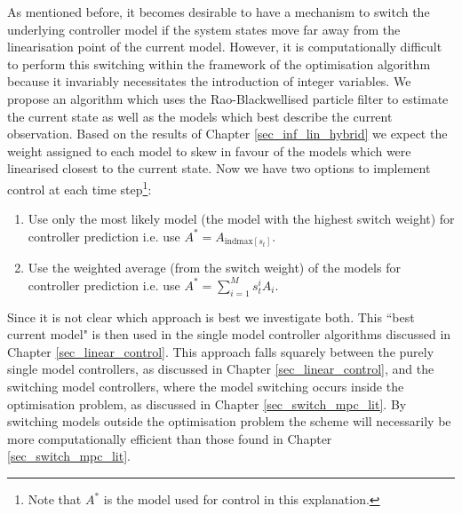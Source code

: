 As mentioned before, it becomes desirable to have a mechanism to switch the underlying controller model if the system states move far away from the linearisation point of the current model. However, it is computationally difficult to perform this switching within the framework of the optimisation algorithm because it invariably necessitates the introduction of integer variables. We propose an algorithm which uses the Rao-Blackwellised particle filter to estimate the current state as well as the models which best describe the current observation. Based on the results of Chapter \ref{sec_inf_lin_hybrid} we expect the weight assigned to each model to skew in favour of the models which were linearised closest to the current state. Now we have two options to implement control at each time step\footnote{Note that $A^*$ is the model used for control in this explanation.}:
\begin{enumerate}
\item
Use only the most likely model (the model with the highest switch weight) for controller prediction i.e. use $A^* = A_{\text{indmax}[s_t]}$.
\item
Use the weighted average (from the switch weight) of the models for controller prediction i.e. use $A^* = \sum_{i=1}^M s_t^i A_i$.
\end{enumerate}
Since it is not clear which approach is best we investigate both. This ``best current model" is then used in the single model controller algorithms discussed in Chapter \ref{sec_linear_control}. This approach falls squarely between the purely single model controllers, as discussed in Chapter \ref{sec_linear_control}, and the switching model controllers, where the model switching occurs inside the optimisation problem, as discussed in Chapter \ref{sec_switch_mpc_lit}. By switching models outside the optimisation problem the scheme will necessarily be more computationally efficient than those found in Chapter \ref{sec_switch_mpc_lit}. 


